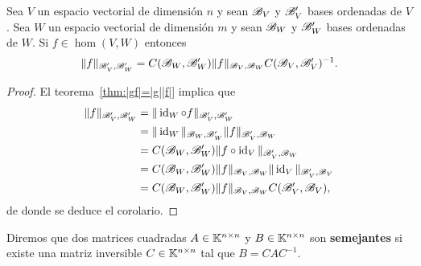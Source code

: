 \begin{cor}
    \label{cor:semejanza:tls}
    Sea $V$ un espacio vectorial de dimensión $n$ y sean $\mathscr{B}_V$ y $\mathscr{B}_V'$
    bases ordenadas de $V$. Sea $W$ un espacio vectorial de dimensión $m$ y sean $\mathscr{B}_W$
    y $\mathscr{B}_W'$ bases ordenadas de $W$. Si $f\in\hom(V,W)$ entonces
    \[
        \|f\|_{\mathscr{B}_V',\mathscr{B}_W'}=C(\mathscr{B}_W,\mathscr{B}_W')\|f\|_{\mathscr{B}_V,\mathscr{B}_W}C(\mathscr{B}_V,\mathscr{B}_V')^{-1}.
    \]
    
    \begin{proof}
		El teorema~\ref{thm:|gf|=|g||f|} implica que
		\begin{align*}
			\|f\|_{\mathscr{B}_V',\mathscr{B}_W'}&=\|\operatorname{id}_W\circ f\|_{\mathscr{B}_V',\mathscr{B}_W'}\\
			&=\|\operatorname{id}_W\|_{\mathscr{B}_W,\mathscr{B}_W'}\|f\|_{\mathscr{B}_V',\mathscr{B}_W}\\
			&=C(\mathscr{B}_W,\mathscr{B}_W')\|f\circ\operatorname{id}_V\|_{\mathscr{B}_V',\mathscr{B}_W}\\
			&=C(\mathscr{B}_W,\mathscr{B}_W')\|f\|_{\mathscr{B}_V,\mathscr{B}_W}\|\operatorname{id}_V\|_{\mathscr{B}_V',\mathscr{B}_V}\\
			&=C(\mathscr{B}_W,\mathscr{B}_W')\|f\|_{\mathscr{B}_V,\mathscr{B}_W}C(\mathscr{B}_V',\mathscr{B}_V),
		\end{align*}
		de donde se deduce el corolario.
    \end{proof}
\end{cor}

\begin{block}
    Diremos que dos matrices cuadradas $A\in\mathbb{K}^{n\times n}$ y $B\in\mathbb{K}^{n\times
    n}$ son \textbf{semejantes} si existe una matriz inversible
    $C\in\mathbb{K}^{n\times n}$ tal que $B=CAC^{-1}$. 
\end{block}

